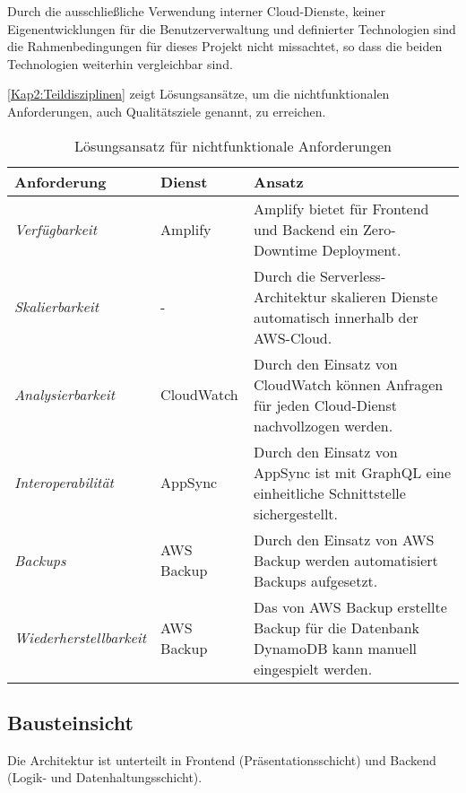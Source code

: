 Durch die ausschließliche Verwendung interner Cloud-Dienste, keiner Eigenentwicklungen für die Benutzerverwaltung und definierter Technologien sind die Rahmenbedingungen für dieses Projekt nicht missachtet, so dass die beiden Technologien weiterhin vergleichbar sind.

\autoref{Kap2:Teildisziplinen} zeigt Lösungsansätze, um die nichtfunktionalen Anforderungen, auch Qualitätsziele genannt, zu erreichen.

\begin{table}[h]
  \caption{Lösungsansatz für nichtfunktionale Anforderungen}
  \label{Kap2:Teildisziplinen}
  \renewcommand{\arraystretch}{1.2}
  \centering
  \sffamily
  \begin{footnotesize}
    \begin{tabularx}{0.9\textwidth}{l l X}
      \toprule
      \textbf{Anforderung} & \textbf{Dienst} & \textbf{Ansatz}\\
      \midrule
        \emph{Verfügbarkeit} & Amplify & Amplify bietet für Frontend und Backend ein Zero-Downtime Deployment. \\
        \emph{Skalierbarkeit} & - & Durch die Serverless-Architektur skalieren Dienste automatisch innerhalb der \ac{AWS}-Cloud.\\
        \emph{Analysierbarkeit} & CloudWatch & Durch den Einsatz von CloudWatch können Anfragen für jeden Cloud-Dienst nachvollzogen werden.\\
        \emph{Interoperabilität} & AppSync & Durch den Einsatz von AppSync ist mit GraphQL eine einheitliche Schnittstelle sichergestellt.\\
        \emph{Backups} & AWS Backup & Durch den Einsatz von AWS Backup werden automatisiert Backups aufgesetzt.\\
        \emph{Wiederherstellbarkeit} & AWS Backup &  Das von AWS Backup erstellte Backup für die Datenbank DynamoDB kann manuell eingespielt werden.\\
      \bottomrule
    \end{tabularx}
  \end{footnotesize}
  \rmfamily
\end{table}

\subsection{Bausteinsicht}

Die Architektur ist unterteilt in Frontend (Präsentationsschicht) und Backend (Logik- und Datenhaltungsschicht).

